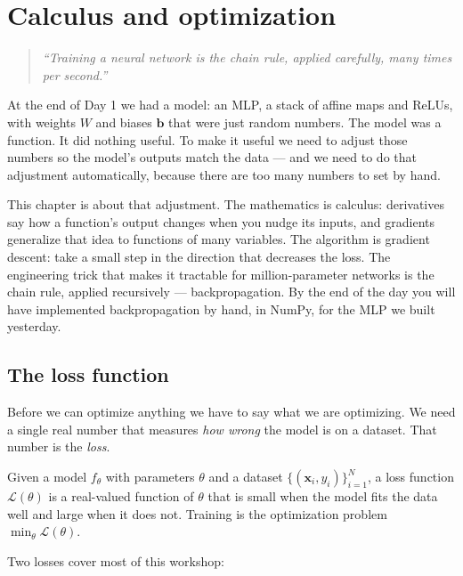 \chapter{Calculus and optimization}
\label{ch:day2}

\begin{quote}
\emph{``Training a neural network is the chain rule, applied carefully, many times per second.''}
\end{quote}

At the end of Day 1 we had a model: an MLP, a stack of affine maps and ReLUs, with weights $W$ and biases $\bm{b}$ that were just random numbers. The model was a function. It did nothing useful. To make it useful we need to adjust those numbers so the model's outputs match the data --- and we need to do that adjustment automatically, because there are too many numbers to set by hand.

This chapter is about that adjustment. The mathematics is calculus: derivatives say how a function's output changes when you nudge its inputs, and gradients generalize that idea to functions of many variables. The algorithm is gradient descent: take a small step in the direction that decreases the loss. The engineering trick that makes it tractable for million-parameter networks is the chain rule, applied recursively --- backpropagation. By the end of the day you will have implemented backpropagation by hand, in NumPy, for the MLP we built yesterday.

\section{The loss function}

Before we can optimize anything we have to say what we are optimizing. We need a single real number that measures \emph{how wrong} the model is on a dataset. That number is the \emph{loss}.

\begin{definition}
Given a model $f_\theta$ with parameters $\theta$ and a dataset $\{(\bm{x}_i, y_i)\}_{i=1}^N$, a loss function $\mathcal{L}(\theta)$ is a real-valued function of $\theta$ that is small when the model fits the data well and large when it does not. Training is the optimization problem $\min_\theta \mathcal{L}(\theta)$.
\end{definition}

Two losses cover most of this workshop:

